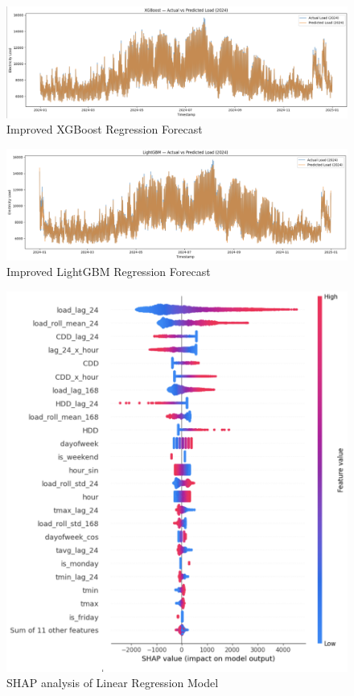 \documentclass[final,numbered]{ifacconf}
\begin{document}
\begin{figure}[htbp]
    \centering
    \includegraphics[width=1.05\textwidth]{boost.png} 
    \caption{Improved XGBoost Regression Forecast}
    \label{fig:load_patterns}
\end{figure}

\begin{figure}[htbp]
    \centering
    \includegraphics[width=1.05\textwidth]{lightgbmimproved.png} 
    \caption{Improved LightGBM Regression Forecast}
    \label{fig:load_patterns}
\end{figure}

\clearpage

\clearpage
\begin{figure}[htbp]
    \centering
    \includegraphics[width=1\linewidth]{shaplinear.png} 
    \caption{SHAP analysis of Linear Regression Model}
    \label{fig:load_patterns3}
\end{figure}
\end{document}
